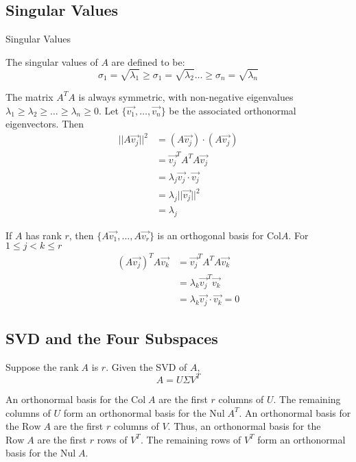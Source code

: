 \subsection{Singular Values}
\begin{definition} Singular Values

    The singular values of \(A\) are defined to be:
    \[\sigma_1 = \sqrt{\lambda_1} \ge \sigma_1 = \sqrt{\lambda_2} \dots \ge \sigma_n = \sqrt{\lambda_n}\]
\end{definition}

\noindent
The matrix \(A^T A\) is always symmetric, with non-negative eigenvalues \(\lambda_1 \ge \lambda_2 \ge \dots \ge \lambda_n \ge 0\). Let \(\{ \Vec{v_1}, \dots, \Vec{v_n} \}\) be the associated orthonormal eigenvectors. Then
\begin{align}
   ||A \Vec{v_j}||^2 &= (A \Vec{v_j}) \cdot (A \Vec{v_j}) \\
   &= \Vec{v_j}^T A^T A \Vec{v_j} \\
   &= \lambda_j \Vec{v_j} \cdot \Vec{v_j} \\
   &= \lambda_j ||\Vec{v_j}||^2 \\
   &= \lambda_j
\end{align}

\noindent
If \(A\) has rank \(r\), then \(\{ A \Vec{v_1}, \dots, A \Vec{v_r}\}\) is an orthogonal basis for \(\text{Col} A\). For \(1\le j < k \le r\)
\begin{align}
    (A \Vec{v_j})^T A \Vec{v_k} &= \Vec{v_j}^T A^T A \Vec{v_k} \\
    &= \lambda_k \Vec{v_j}^T \Vec{v_k} \\
    &= \lambda_k \Vec{v_j} \cdot \Vec{v_k} = 0
\end{align}

\subsection{SVD and the Four Subspaces}
Suppose the \(\text{rank} \; A\) is \(r\). Given the SVD of \(A\),
\begin{equation}
    A = U \Sigma V^T
\end{equation}

\noindent
An orthonormal basis for the \(\text{Col}\; A\) are the first \(r\) columns of \(U\). The remaining columns of \(U\) form an orthonormal basis for the \(\text{Nul}\; A^T\). An orthonormal basis for the \(\text{Row}\; A\) are the first \(r\) columns of \(V\). Thus, an orthonormal basis for the \(\text{Row}\; A\) are the first \(r\) rows of \(V^T\). The remaining rows of \(V^T\) form an orthonormal basis for the \(\text{Nul}\; A\).

